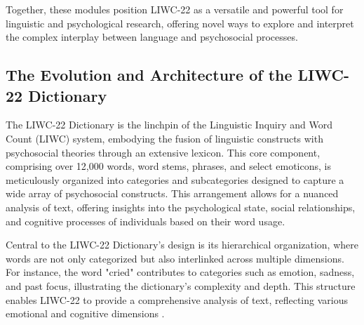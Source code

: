 Together, these modules position LIWC-22 as a versatile and powerful tool for linguistic and psychological research, offering novel ways to explore and interpret the complex interplay between language and psychosocial processes.

\subsection{The Evolution and Architecture of the LIWC-22 Dictionary}

\quad The LIWC-22 Dictionary is the linchpin of the Linguistic Inquiry and Word Count (LIWC) system, embodying the fusion of linguistic constructs with psychosocial theories through an extensive lexicon. This core component, comprising over 12,000 words, word stems, phrases, and select emoticons, is meticulously organized into categories and subcategories designed to capture a wide array of psychosocial constructs. This arrangement allows for a nuanced analysis of text, offering insights into the psychological state, social relationships, and cognitive processes of individuals based on their word usage.

Central to the LIWC-22 Dictionary's design is its hierarchical organization, where words are not only categorized but also interlinked across multiple dimensions. For instance, the word "cried" contributes to categories such as emotion, sadness, and past focus, illustrating the dictionary's complexity and depth. This structure enables LIWC-22 to provide a comprehensive analysis of text, reflecting various emotional and cognitive dimensions \cite{boyd2022development}.

